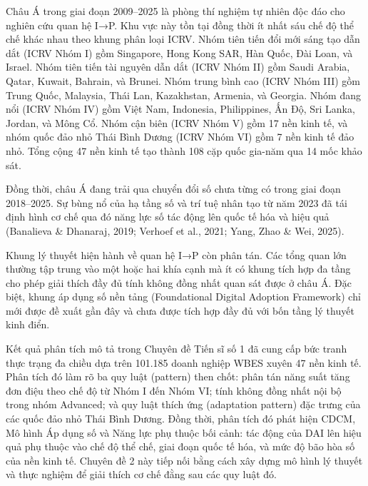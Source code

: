\documentclass[12pt,a4paper]{article}
\begin{document}
Châu Á trong giai đoạn 2009--2025 là phòng thí nghiệm tự nhiên độc đáo
cho nghiên cứu quan hệ I→P. Khu vực này tồn tại đồng thời ít nhất sáu
chế độ thể chế khác nhau theo khung phân loại ICRV. Nhóm tiên tiến đổi
mới sáng tạo dẫn dắt (ICRV Nhóm I) gồm Singapore, Hong Kong SAR, Hàn
Quốc, Đài Loan, và Israel. Nhóm tiên tiến tài nguyên dẫn dắt (ICRV Nhóm
II) gồm Saudi Arabia, Qatar, Kuwait, Bahrain, và Brunei. Nhóm trung bình
cao (ICRV Nhóm III) gồm Trung Quốc, Malaysia, Thái Lan, Kazakhstan,
Armenia, và Georgia. Nhóm đang nổi (ICRV Nhóm IV) gồm Việt Nam,
Indonesia, Philippines, Ấn Độ, Sri Lanka, Jordan, và Mông Cổ. Nhóm cận
biên (ICRV Nhóm V) gồm 17 nền kinh tế, và nhóm quốc đảo nhỏ Thái Bình
Dương (ICRV Nhóm VI) gồm 7 nền kinh tế đảo nhỏ. Tổng cộng 47 nền kinh tế
tạo thành 108 cặp quốc gia-năm qua 14 mốc khảo sát.

Đồng thời, châu Á đang trải qua chuyển đổi số chưa từng có trong giai
đoạn 2018--2025. Sự bùng nổ của hạ tầng số và trí tuệ nhân tạo từ năm
2023 đã tái định hình cơ chế qua đó năng lực số tác động lên quốc tế hóa
và hiệu quả (Banalieva \& Dhanaraj, 2019; Verhoef et al., 2021; Yang,
Zhao \& Wei, 2025).

Khung lý thuyết hiện hành về quan hệ I→P còn phân tán. Các tổng quan lớn
thường tập trung vào một hoặc hai khía cạnh mà ít có khung tích hợp đa
tầng cho phép giải thích đầy đủ tính không đồng nhất quan sát được ở
châu Á. Đặc biệt, khung áp dụng số nền tảng (Foundational Digital
Adoption Framework) chỉ mới được đề xuất gần đây và chưa được tích hợp
đầy đủ với bốn tầng lý thuyết kinh điển.

Kết quả phân tích mô tả trong Chuyên đề Tiến sĩ số 1 đã cung cấp bức
tranh thực trạng đa chiều dựa trên 101.185 doanh nghiệp WBES xuyên 47
nền kinh tế. Phân tích đó làm rõ ba quy luật (pattern) then chốt: phân
tán năng suất tăng đơn điệu theo chế độ từ Nhóm I đến Nhóm VI; tính
không đồng nhất nội bộ trong nhóm Advanced; và quy luật thích ứng
(adaptation pattern) đặc trưng của các quốc đảo nhỏ Thái Bình Dương.
Đồng thời, phân tích đó phát hiện CDCM, Mô hình Áp dụng số và Năng lực
phụ thuộc bối cảnh: tác động của DAI lên hiệu quả phụ thuộc vào chế độ
thể chế, giai đoạn quốc tế hóa, và mức độ bão hòa số của nền kinh tế.
Chuyên đề 2 này tiếp nối bằng cách xây dựng mô hình lý thuyết và thực
nghiệm để giải thích cơ chế đằng sau các quy luật đó.
\end{document}

